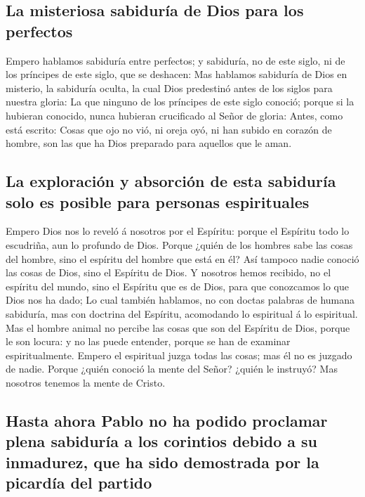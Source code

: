 \hypertarget{la-misteriosa-sabiduruxeda-de-dios-para-los-perfectos}{%
\subsection{La misteriosa sabiduría de Dios para los
perfectos}\label{la-misteriosa-sabiduruxeda-de-dios-para-los-perfectos}}

 Empero hablamos sabiduría entre perfectos; y sabiduría, no
de este siglo, ni de los príncipes de este siglo, que se deshacen:
 Mas hablamos sabiduría de Dios en misterio, la sabiduría
oculta, la cual Dios predestinó antes de los siglos para nuestra gloria:
 La que ninguno de los príncipes de este siglo conoció;
porque si la hubieran conocido, nunca hubieran crucificado al Señor de
gloria:  Antes, como está escrito: Cosas que ojo no vió, ni
oreja oyó, ni han subido en corazón de hombre, son las que ha Dios
preparado para aquellos que le aman.

\hypertarget{la-exploraciuxf3n-y-absorciuxf3n-de-esta-sabiduruxeda-solo-es-posible-para-personas-espirituales}{%
\subsection{La exploración y absorción de esta sabiduría solo es posible
para personas
espirituales}\label{la-exploraciuxf3n-y-absorciuxf3n-de-esta-sabiduruxeda-solo-es-posible-para-personas-espirituales}}

 Empero Dios nos lo reveló á nosotros por el Espíritu:
porque el Espíritu todo lo escudriña, aun lo profundo de Dios.
 Porque ¿quién de los hombres sabe las cosas del hombre,
sino el espíritu del hombre que está en él? Así tampoco nadie conoció
las cosas de Dios, sino el Espíritu de Dios.  Y nosotros
hemos recibido, no el espíritu del mundo, sino el Espíritu que es de
Dios, para que conozcamos lo que Dios nos ha dado;  Lo cual
también hablamos, no con doctas palabras de humana sabiduría, mas con
doctrina del Espíritu, acomodando lo espiritual á lo espiritual.
 Mas el hombre animal no percibe las cosas que son del
Espíritu de Dios, porque le son locura: y no las puede entender, porque
se han de examinar espiritualmente.  Empero el espiritual
juzga todas las cosas; mas él no es juzgado de nadie. 
Porque ¿quién conoció la mente del Señor? ¿quién le instruyó? Mas
nosotros tenemos la mente de Cristo.

\hypertarget{hasta-ahora-pablo-no-ha-podido-proclamar-plena-sabiduruxeda-a-los-corintios-debido-a-su-inmadurez-que-ha-sido-demostrada-por-la-picarduxeda-del-partido}{%
\subsection{Hasta ahora Pablo no ha podido proclamar plena sabiduría a
los corintios debido a su inmadurez, que ha sido demostrada por la
picardía del
partido}\label{hasta-ahora-pablo-no-ha-podido-proclamar-plena-sabiduruxeda-a-los-corintios-debido-a-su-inmadurez-que-ha-sido-demostrada-por-la-picarduxeda-del-partido}}

